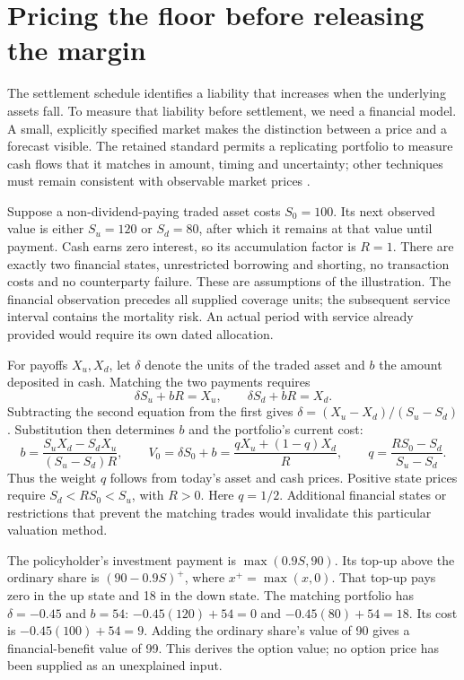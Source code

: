 \section{Pricing the floor before releasing the margin}
\label{sec:insurance-priced-guarantee}

The settlement schedule identifies a liability that increases when the
underlying assets fall. To measure that liability before settlement, we need
a financial model. A small, explicitly specified market makes the distinction
between a price and a forecast visible. The retained standard permits a
replicating portfolio to measure cash flows that it matches in amount, timing
and uncertainty; other techniques must remain consistent with observable
market prices \citep[paragraphs B44--B48]{aasb17}.

Suppose a non-dividend-paying traded asset costs $S_0=100$. Its next observed
value is either $S_u=120$ or $S_d=80$, after which it remains at that value
until payment. Cash earns zero interest, so its accumulation factor is $R=1$.
There are exactly two financial states, unrestricted borrowing and shorting,
no transaction costs and no counterparty failure. These are assumptions of
the illustration. The financial observation precedes all supplied coverage
units; the subsequent service interval contains the mortality risk. An actual
period with service already provided would require its own dated allocation.

For payoffs $X_u,X_d$, let $\delta$ denote the units of the traded asset and
$b$ the amount deposited in cash. Matching the two payments requires
\[
 \delta S_u+bR=X_u,\qquad \delta S_d+bR=X_d.
\]
Subtracting the second equation from the first gives
$\delta=(X_u-X_d)/(S_u-S_d)$. Substitution then determines $b$ and the
portfolio's current cost:
\[
 b=\frac{S_uX_d-S_dX_u}{(S_u-S_d)R},\qquad
 V_0=\delta S_0+b
     =\frac{qX_u+(1-q)X_d}{R},\qquad
 q=\frac{RS_0-S_d}{S_u-S_d}.
\]
Thus the weight $q$ follows from today's asset and cash prices. Positive
state prices require $S_d<RS_0<S_u$, with $R>0$. Here $q=1/2$.
Additional financial states or restrictions that prevent the matching trades
would invalidate this particular valuation method.

The policyholder's investment payment is $\max(0.9S,90)$. Its top-up above
the ordinary share is $(90-0.9S)^+$, where $x^+=\max(x,0)$.
That top-up pays zero in the up state and 18 in the down state.
The matching portfolio has $\delta=-0.45$ and $b=54$:
$-0.45(120)+54=0$ and $-0.45(80)+54=18$.
Its cost is $-0.45(100)+54=9$. Adding the ordinary share's value of 90
gives a financial-benefit value of 99. This derives the option value; no
option price has been supplied as an unexplained input.

